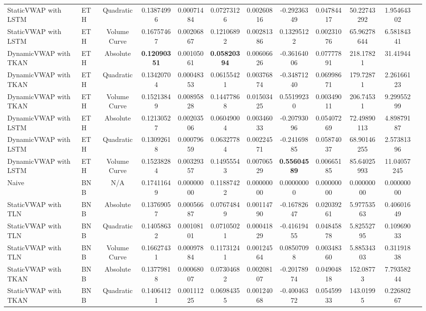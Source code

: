 \begin{table}[H]
{\begin{tabular}{llcccccccccc}
        StaticVWAP with LSTM & ETH & Quadratic & 0.13874996 & 0.00071484 & 0.07273126 & 0.00260816 & -0.29236349 & 0.04784417 & 50.22743292 & 1.95464302 \\
        StaticVWAP with LSTM & ETH & Volume Curve & 0.16757467 & 0.00206867 & 0.12106892 & 0.00281386 & 0.13295122 & 0.00231076 & 65.96278644 & 6.58184341 \\
        DynamicVWAP with TKAN & ETH & Absolute & \textbf{0.12090351} & 0.00105061 &  \textbf{0.05820394} & 0.00606626 & -0.36164006 & 0.07777891 & 218.17821 & 31.41944 \\
        DynamicVWAP with TKAN & ETH & Quadratic & 0.13420704 & 0.00048353 & 0.06155421 & 0.00376874 & -0.34871240 & 0.06998671 & 179.72871 & 2.26166123 \\
        DynamicVWAP with TKAN & ETH & Volume Curve & 0.15213849 & 0.00895828 & 0.14477868 & 0.01503425 & 0.55199230 & 0.00349011 & 206.74531 & 9.29955299 \\
        DynamicVWAP with LSTM & ETH & Absolute & 0.12130527 & 0.00203506 & 0.06049004 & 0.00346033 & -0.20793096 & 0.05407269 & 72.49890113 & 4.89879187 \\
        DynamicVWAP with LSTM & ETH & Quadratic & 0.13092618 & 0.00079659 & 0.06327784 & 0.00224571 & -0.24169885 & 0.05874037 & 68.90146255 & 2.57381396 \\
        DynamicVWAP with LSTM & ETH & Volume Curve & 0.15238284 & 0.00329357 & 0.14955543 & 0.00706529 & \textbf{0.55604589} & 0.00665185 & 85.64025993 & 11.04057245 \\
        \hline
        Naive & BNB & N/A & 0.17411649 & 0.00000000 & 0.11887422 & 0.00000000 & 0.00000000 & 0.00000000 & 0.00000000 & 0.00000000 \\
        StaticVWAP with TLN & BNB & Absolute & 0.13769057 & 0.00056687 & 0.07674849 & 0.00114790 & -0.16782647 & 0.02039261 & 5.97753563 & 0.40601649 \\
        StaticVWAP with TLN & BNB & Quadratic & 0.14058632 & 0.00108101 & 0.07105021 & 0.00041829 & -0.41619455 & 0.04845878 & 5.82552795 & 0.10969033 \\
        StaticVWAP with TLN & BNB & Volume Curve & 0.16627431 & 0.00097884 & 0.11731241 & 0.00124564 & 0.08507098 & 0.00348360 & 5.88534303 & 0.31191838 \\
        StaticVWAP with TKAN & BNB & Absolute & 0.13779818 & 0.00068007 & 0.07304682 & 0.00208107 & -0.20178974 & 0.04904818 & 152.08773 & 7.79358244 \\
        StaticVWAP with TKAN & BNB & Quadratic & 0.14064121 & 0.00111225 & 0.06984355 & 0.00124068 & -0.40046372 & 0.05459933 & 143.01995 & 0.22680267 \\

\end{tabular}}
\end{table}
